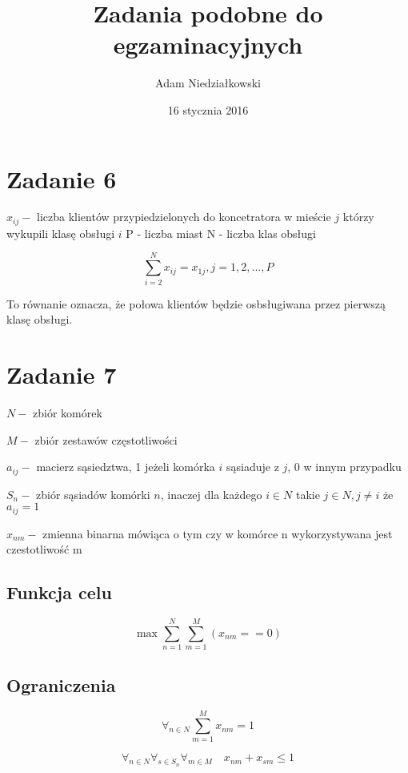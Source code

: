 \documentclass{article}
\title{Zadania podobne do egzaminacyjnych}
\author{Adam Niedziałkowski}
\date{16 stycznia 2016}
\begin{document}
\maketitle

\section{Zadanie 6}
$x_{ij} - $ liczba klientów przypiedzielonych do koncetratora w mieście $j$
którzy wykupili klasę obsługi $i$
P - liczba miast
N - liczba klas obsługi

\begin{equation}
  \sum_{i=2}^{N} x_{ij} = x_{1j} , j=1,2,...,P
\end{equation}

To równanie oznacza, że połowa klientów będzie osbsługiwana przez pierwszą klasę obsługi.

\section{Zadanie 7}


$N -$ zbiór komórek

$M -$ zbiór zestawów częstotliwości

$a_{ij} - $ macierz sąsiedztwa, 1 jeżeli komórka $i$ sąsiaduje z $j$, 0 w innym przypadku

$S_n - $ zbiór sąsiadów komórki $n$, inaczej dla każdego $i \in N$ takie $j \in N, j \neq i$ że $a_{ij} = 1$

$x_{nm} - $ zmienna binarna mówiąca o tym czy w komórce n wykorzystywana jest czestotliwość m

\subsection{Funkcja celu}
\begin{equation}
  \max \sum_{n=1}^N \sum_{m=1}^M (x_{nm} == 0)
\end{equation}

\subsection{Ograniczenia}

\begin{equation}
  \forall_{n \in N} \sum_{m=1}^{M} x_{nm} = 1
\end{equation}

\begin{equation}
  \forall_{n \in N} \forall_{s \in S_n} \forall_{m \in M} \quad x_{nm} + x_{sm} \le 1
\end{equation}
\end{document}
